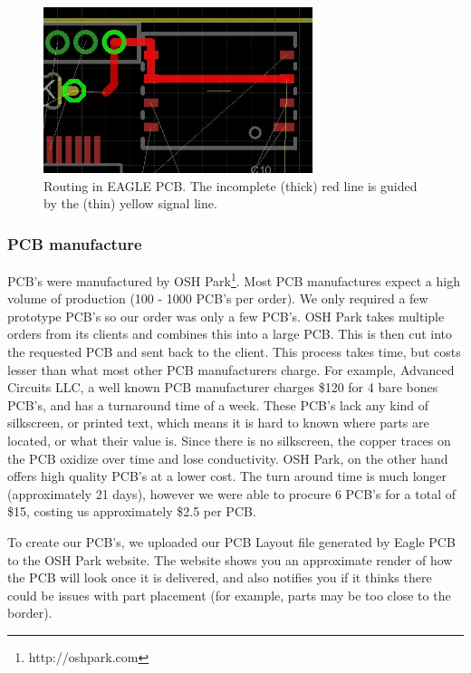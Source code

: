 \begin{figure}
\begin{center}
\includegraphics[width=0.7\textwidth]{images/Layout3.jpg}
\caption{Routing in EAGLE PCB. The incomplete (thick) red line is guided by the (thin) yellow signal line.}
\label{Fig:Layout3}
\end{center}
\end{figure}
\subsubsection{PCB manufacture}
PCB's were manufactured by OSH Park\footnote{http://oshpark.com}.
Most PCB manufactures expect a high volume of production (100 - 1000 PCB's per order).
We only required a few prototype PCB's so our order was only a few PCB's.
OSH Park takes multiple orders from its clients and combines this into a large PCB.
This is then cut into the requested PCB and sent back to the client.
This process takes time, but costs lesser than what most other PCB manufacturers charge.
For example,
Advanced Circuits LLC,
a well known PCB manufacturer charges \$120 for 4 bare bones PCB's,
and has a turnaround time of a week.
These PCB's lack any kind of silkscreen,
or printed text,
which means it is hard to known where parts are located,
or what their value is.
Since there is no silkscreen,
the copper traces on the PCB oxidize over time and lose conductivity.
OSH Park,
on the other hand offers high quality PCB's at a lower cost.
The turn around time is much longer (approximately 21 days),
however we were able to procure 6 PCB's for a total of \$15,
costing us approximately \$2.5 per PCB.

To create our PCB's, we uploaded our PCB Layout file generated by Eagle PCB to the OSH Park website.
The website shows you an approximate render of how the PCB will look once it is delivered,
and also notifies you if it thinks there could be issues with part placement (for example, parts may be too close to the border).


